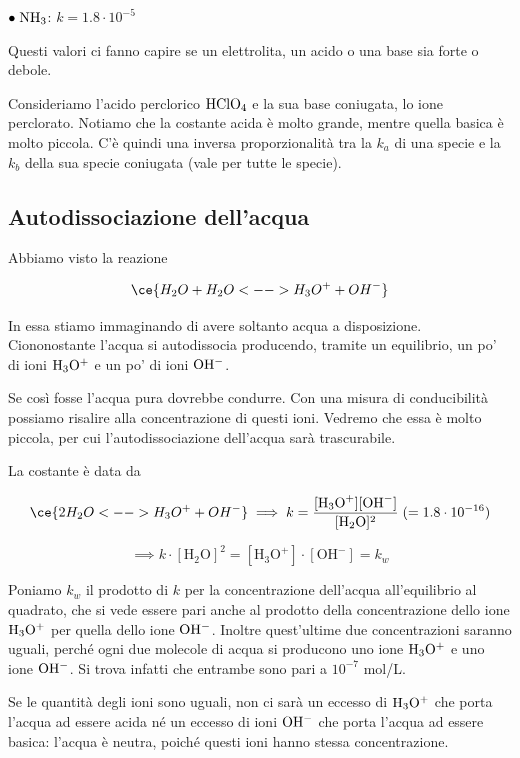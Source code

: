 \vspace{0.2cm}$\bullet \; \rm NH_3$: $k=1.8 \cdot 10^{-5}$

\vspace{0.4cm}Questi valori ci fanno capire se un elettrolita, un acido o una base sia forte o debole.

Consideriamo l'acido perclorico $\rm HClO_4$ e la sua base coniugata, lo ione perclorato. Notiamo che la costante acida è molto grande, mentre quella basica è molto piccola. C'è quindi una inversa proporzionalità tra la $k_a$ di una specie e la $k_b$ della sua specie coniugata (vale per tutte le specie).
\newpage
\subsection{Autodissociazione dell'acqua}
Abbiamo visto la reazione

$$\ce{H_2O + H_2O <--> H_3O^+ + OH^-}$$

In essa stiamo immaginando di avere soltanto acqua a disposizione. Ciononostante l'acqua si autodissocia producendo, tramite un equilibrio, un po' di ioni $\rm H_3O^+$ e un po' di ioni $\rm OH^-$.

Se così fosse l'acqua pura dovrebbe condurre. Con una misura di conducibilità possiamo risalire alla concentrazione di questi ioni. Vedremo che essa è molto piccola, per cui l'autodissociazione dell'acqua sarà trascurabile.

La costante è data da

$$\ce{2 H_2O <--> H_3O^+ + OH^-}
\implies
k= \frac{[\text{H}_3\text{O}^+] [\text{OH}^-]}{[\text{H}_2\text{O}]^2} \; (=1.8 \cdot 10^{-16})$$

$$\implies k \cdot [\text{H}_2\text{O}]^2 = [\text{H}_3\text{O}^+] \cdot [\text{OH}^-] = k_w$$

Poniamo $k_w$ il prodotto di $k$ per la concentrazione dell'acqua all'equilibrio al quadrato, che si vede essere pari anche al prodotto della concentrazione dello ione $\rm H_3O^+$ per quella dello ione $\rm OH^-$. Inoltre quest'ultime due concentrazioni saranno uguali, perché ogni due molecole di acqua si producono uno ione $\rm H_3O^+$ e uno ione $\rm OH^-$. Si trova infatti che entrambe sono pari a $10^{-7}$ mol/L.

Se le quantità degli ioni sono uguali, non ci sarà un eccesso di $\rm H_3O^+$ che porta l'acqua ad essere acida né un eccesso di ioni $\rm OH^-$ che porta l'acqua ad essere basica: l'acqua è neutra, poiché questi ioni hanno stessa concentrazione.


